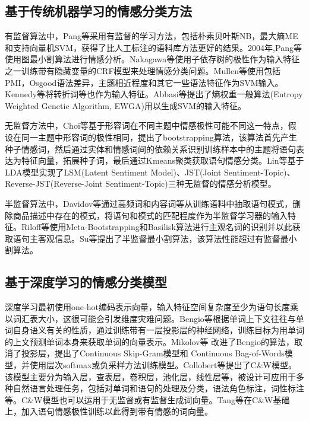 \subsection{基于传统机器学习的情感分类方法}
有监督算法中，Pang等\cite{bopang2002}采用有监督的学习方法，包括朴素贝叶斯NB，最大熵ME和支持向量机SVM，获得了比人工标注的语料库方法更好的结果。2004年,Pang等\cite{Pang2004}使用图最小割算法进行情感分析。Nakagawa等\cite{Nakagawa2010}使用子依存树的极性作为输入特征之一训练带有隐藏变量的CRF模型来处理情感分类问题。Mullen等\cite{Mullen2004}使用包括PMI，Osgood语法差异\cite{Osgood1957}，主题相近程度和其它一些语法特征作为SVM输入。Kennedy等\cite{Kennedy2006}将转折词等也作为输入特征。Abbasi等\cite{Abbasi2008}提出了熵权重一般算法(Entropy Weighted Genetic Algorithm, EWGA)用以生成SVM的输入特征。

无监督方法中，Choi等\cite{Do2015}基于形容词在不同主题中情感极性可能不同这一特点，假设在同一主题中形容词的极性相同，提出了bootstrapping算法，该算法首先产生种子情感词，然后通过实体和情感词间的依赖关系识别训练样本中的主题将语句表达为特征向量，拓展种子词，最后通过Kmeans聚类获取语句情感分类。Lin等\cite{Lin2010}基于LDA模型实现了LSM(Latent Sentiment Model)、JST(Joint Sentiment-Topic)、Reverse-JST(Reverse-Joint Sentiment-Topic)三种无监督的情感分析模型。

半监督算法中，Davidov等\cite{Davidov2010}通过高频词和内容词等从训练语料中抽取语句模式，删除商品描述中存在的模式，将语句和模式的匹配程度作为半监督学习器的输入特征。Riloff等\cite{Riloff2003}使用Meta-Bootstrapping和Basilisk算法进行主观名词的识别并以此获取语句主客观信息。Su等\cite{Su2009}提出了半监督最小割算法，该算法性能超过有监督最小割算法。
\subsection{基于深度学习的情感分类模型}
深度学习最初使用one-hot编码表示向量，输入特征空间复杂度至少为语句长度乘以词汇表大小，这很可能会引发维度灾难问题。Bengio等\cite{Bengio2003}根据单词上下文往往与单词自身语义有关的性质，通过训练带有一层投影层的神经网络，训练目标为用单词的上文预测单词本身来获取单词的向量表示。Mikolov等\cite{mikolov2013} \cite{mikolov2013b}改进了Bengio的算法，取消了投影层，提出了Continuous Skip-Gram模型和 Continuous Bag-of-Words模型，并使用层次softmax或负采样方法训练模型。Collobert等\cite{collobert2011}提出了C\&W模型。该模型主要分为输入层，查表层，卷积层，池化层，线性层等，被设计可应用于多种自然语言处理任务，包括对单词和语句的处理及分类，语法角色标注，词性标注等。C\&W模型也可以运用于无监督或有监督生成词向量。Tang等\cite{Tang2014c}在C\&W基础上，加入语句情感极性训练以此得到带有情感的词向量。


